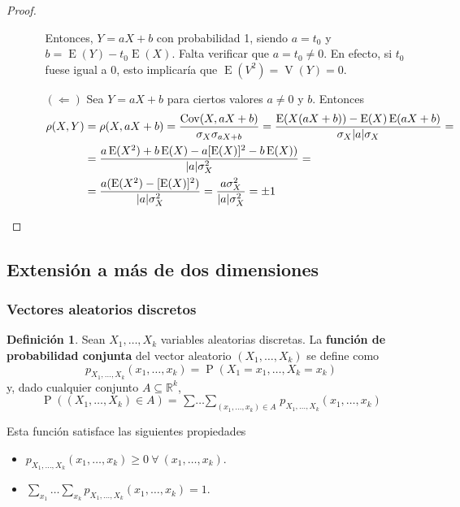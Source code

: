 \documentclass[11pt]{article}
\theoremstyle{plain}
\theoremstyle{definition}
\newtheorem*{defi}{Definición}
\theoremstyle{remark}
\newcommand{\deft}[1]{\textbf{#1}}  %
\newcommand{\proba}{\ensuremath{\operatorname{P}}}  %
\newcommand{\esp}[0]{\ensuremath{\operatorname{E}}}  %
\newcommand{\var}[0]{\ensuremath{\operatorname{V}}}  %
\newcommand{\cov}[0]{\ensuremath{\operatorname{Cov}}}  %
\newcommand{\foralle}{\ensuremath{\forall \ }}  %
\begin{document}
\begin{proof}
\begin{enumerate}
\begin{itemize}
            Entonces, $Y = aX + b$ con probabilidad 1, siendo $a = t_0$ y $b = \esp(Y) - t_0 \esp(X)$. Falta verificar que $a = t_0 \neq 0$. En efecto, si $t_0$ fuese igual a 0, esto implicaría que $\esp(V^2) = \var(Y) = 0$.

            \item[$(\Leftarrow)$] Sea $Y = aX + b$ para ciertos valores $a \neq 0$ y $b$. Entonces
            \[ \begin{split}
              \rho(X,Y) &= \rho(X, aX+b) = \frac{\cov(X, aX + b)}{\sigma_X \sigma_{aX + b}} = \frac{\esp(X(aX + b)) - \esp(X) \esp(aX + b)}{\sigma_X \vert a \vert \sigma_X} = \\
              &= \frac{a \esp(X^2) + b \esp(X) - a[\esp(X)]^2 - b \esp(X))}{\vert a \vert \sigma_X^2} = \\
              &= \frac{a(\esp(X^2) - [\esp(X)]^2)}{\vert a \vert \sigma_X^2} = \frac{a \sigma_X^2}{\vert a \vert \sigma_X^2} = \pm 1 \qedhere
            \end{split} \]
          \end{itemize}
        \end{enumerate}
      \end{proof}

  \subsection{Extensión a más de dos dimensiones}

    \subsubsection{Vectores aleatorios discretos}

      \begin{defi}
        Sean $X_1, \dots, X_k$ variables aleatorias discretas. La \deft{función de probabilidad conjunta} del vector aleatorio $(X_1, \dots, X_k)$ se define como
        \[ p_{X_1, \dots, X_k} (x_1, \dots, x_k) = \proba(X_1 = x_1, \dots, X_k = x_k) \]
        y, dado cualquier conjunto $A \subseteq \mathbb{R}^k$,
        \[ \proba((X_1, \dots, X_k) \in A) = \mathop{\sum \dots \sum}_{(x_1, \dots, x_k) \in A} p_{X_1, \dots, X_k} (x_1, \dots, x_k) \]
      \end{defi}

      Esta función satisface las siguientes propiedades
      \begin{itemize}
        \item $p_{X_1, \dots, X_k} (x_1, \dots, x_k) \geq 0 \ \foralle (x_1, \dots, x_k)$.
        \item $\sum_{x_1} \dots \sum_{x_k} p_{X_1, \dots, X_k} (x_1, \dots, x_k) = 1$.
      \end{itemize}
\end{document}
